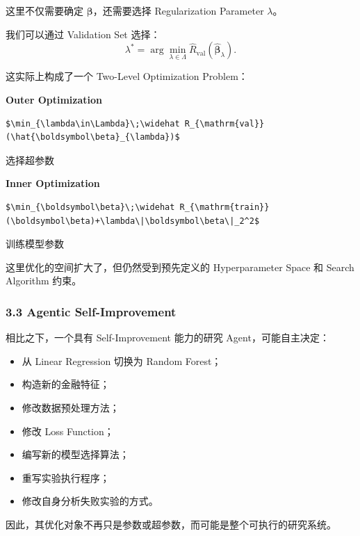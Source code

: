 这里不仅需要确定 \(\boldsymbol\beta\)，还需要选择 Regularization Parameter \(\lambda\)。

我们可以通过 Validation Set 选择：
\[\lambda^*
=
\arg\min_{\lambda\in\Lambda}
\widehat R_{\mathrm{val}}
(\hat{\boldsymbol\beta}_{\lambda}).\]

这实际上构成了一个 Two-Level Optimization Problem：

\textbf{Outer Optimization}

\begin{verbatim}
$\min_{\lambda\in\Lambda}\;\widehat R_{\mathrm{val}}(\hat{\boldsymbol\beta}_{\lambda})$
\end{verbatim}

选择超参数

\textbf{Inner Optimization}

\begin{verbatim}
$\min_{\boldsymbol\beta}\;\widehat R_{\mathrm{train}}(\boldsymbol\beta)+\lambda\|\boldsymbol\beta\|_2^2$
\end{verbatim}

训练模型参数

这里优化的空间扩大了，但仍然受到预先定义的 Hyperparameter Space 和 Search Algorithm 约束。

\hypertarget{part-1-03-0001-agentic-self-improvement}{%
\subsubsection{3.3 Agentic Self-Improvement}\label{part-1-03-0001-agentic-self-improvement}}

相比之下，一个具有 Self-Improvement 能力的研究 Agent，可能自主决定：

\begin{itemize}
\tightlist
\item
  从 Linear Regression 切换为 Random Forest；
\item
  构造新的金融特征；
\item
  修改数据预处理方法；
\item
  修改 Loss Function；
\item
  编写新的模型选择算法；
\item
  重写实验执行程序；
\item
  修改自身分析失败实验的方式。
\end{itemize}

因此，其优化对象不再只是参数或超参数，而可能是整个可执行的研究系统。

